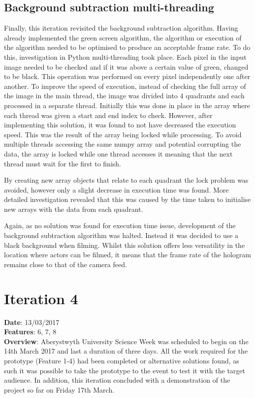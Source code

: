 \subsection{Background subtraction multi-threading}
Finally, this iteration revisited the background subtraction algorithm. Having already implemented the green screen algorithm, the algorithm or execution of the algorithm needed to be optimised to produce an acceptable frame rate. To do this, investigation in Python multi-threading took place. Each pixel in the input image needed to be checked and if it was above a certain value of green, changed to be black. This operation was performed on every pixel independently one after another. To improve the speed of execution, instead of checking the full array of the image in the main thread, the image was divided into 4 quadrants and each processed in a separate thread. Initially this was done in place in the array where each thread was given a start and end index to check. However, after implementing this solution, it was found to not have decreased the execution speed. This was the result of the array being locked while processing. To avoid multiple threads accessing the same numpy array and potential corrupting the data, the array is locked while one thread accesses it meaning that the next thread must wait for the first to finish. 

By creating new array objects that relate to each quadrant the lock problem was avoided, however only a slight decrease in execution time was found. More detailed investigation revealed that this was caused by the time taken to initialise new arrays with the data from each quadrant.

Again, as no solution was found for execution time issue, development of the background subtraction algorithm was halted. Instead it was decided to use a black background when filming. Whilst this solution offers less versatility in the location where actors can be filmed, it means that the frame rate of the hologram remains close to that of the camera feed. 

  
\newpage

\section{Iteration 4}
\textbf{Date}: 13/03/2017 \\
\textbf{Features}: 6, 7, 8 \\
\textbf{Overview}: Aberystwyth University Science Week was scheduled to begin on the 14th March 2017 and last a duration of three days. All the work required for the prototype (Feature 1-4) had been completed or alternative solutions found, as such it was possible to take the prototype to the event to test it with the target audience. In addition, this iteration concluded with a demonstration of the project so far on Friday 17th March. 

